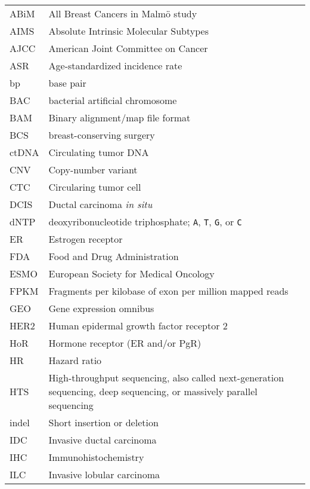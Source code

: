 
{
\setlength{\extrarowheight}{0.1cm}  %
\begin{longtabu}{lX}
ABiM       & All Breast Cancers in Malmö study \\
AIMS       & Absolute Intrinsic Molecular Subtypes \\
AJCC       & American Joint Committee on Cancer \\
ASR        & Age-standardized incidence rate \\
bp         & base pair \\
BAC        & bacterial artificial chromosome \\
BAM        & Binary alignment/map file format \\
BCS        & breast-conserving surgery \\
ctDNA      & Circulating tumor DNA \\
CNV        & Copy-number variant \\
CTC        & Circularing tumor cell \\
DCIS       & Ductal carcinoma \textit{in situ} \\
dNTP       & deoxyribonucleotide triphosphate; \texttt{A}, \texttt{T}, \texttt{G}, or \texttt{C} \\
ER         & Estrogen receptor \\
FDA        & Food and Drug Administration \\
ESMO       & European Society for Medical Oncology \\
FPKM       & Fragments per kilobase of exon per million mapped reads \\
GEO        & Gene expression omnibus \\
HER2       & Human epidermal growth factor receptor 2 \\
HoR        & Hormone receptor (ER and/or PgR) \\
HR         & Hazard ratio \\
HTS        & High-throughput sequencing, also called next-generation sequencing, deep sequencing, or massively parallel sequencing \\
indel      & Short insertion or deletion \\
IDC        & Invasive ductal carcinoma \\
IHC        & Immunohistochemistry \\
ILC        & Invasive lobular carcinoma \\

\end{longtabu}}
